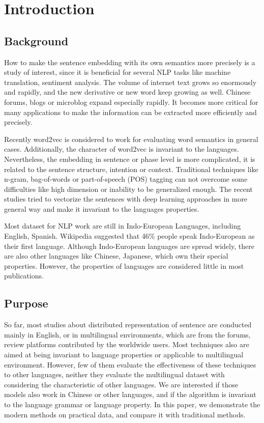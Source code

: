 \chapter{Introduction}
\setlength{\baselineskip}{1.5em}
\setlength{\parindent}{2em}
\setlength{\parskip}{1em}

\section{Background}

How to make the sentence embedding with its own semantics more precisely is a study of interest, since it is beneficial for several NLP tasks like machine translation, sentiment analysis. 
The volume of internet text grows so enormously and rapidly, and the new derivative or new word keep growing as well.
Chinese forums, blogs or microblog expand especially rapidly. 
It becomes more critical for many applications to make the information can be extracted more efficiently and precisely.  

Recently word2vec\cite{word2vec} is considered to work for evaluating word semantics in general cases.  
Additionally, the character of word2vec is invariant to the languages. Nevertheless, 
the embedding in sentence or phase level is more complicated, it is related to the sentence structure, intention or context. 
Traditional techniques like n-gram, bag-of-words or part-of-speech (POS) tagging can not overcome some difficulties like high dimension or inability to be generalized enough.  
The recent studies tried to vectorize the sentences with deep learning approaches in more general way and make it invariant to the languages properties.  


Most dataset for NLP work are still in Indo-European Languages, including English, Spanish. Wikipedia suggested that 46\% people speak Indo-European as their first language. 
Although Indo-European languages are spread widely, there are also other languages like Chinese, Japanese, which own their special properties.
However, the properties of languages are considered little in most publications.

\section{Purpose}

So far, most studies about distributed representation of sentence are conducted mainly in English, or in multilingual environments, which are from the forums, review platforms contributed by the worldwide users. Most techniques also are aimed at being invariant to language properties or applicable to multilingual environment. 
However, few of them evaluate the effectiveness of these techniques to other languages, neither they evaluate the multilingual dataset with considering the characteristic of other languages.   
We are interested if those models also work in Chinese or other languages, and if the algorithm is invariant to the language grammar or language property. 
In this paper, we demonstrate the modern methods on practical data, and compare it with traditional methods.